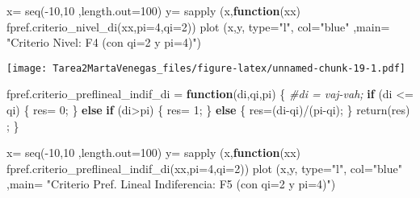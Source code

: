 \documentclass[
]{article}
\newenvironment{Shaded}{\begin{snugshade}}{\end{snugshade}}
\newcommand{\AttributeTok}[1]{\textcolor[rgb]{0.77,0.63,0.00}{#1}}
\newcommand{\CommentTok}[1]{\textcolor[rgb]{0.56,0.35,0.01}{\textit{#1}}}
\newcommand{\ControlFlowTok}[1]{\textcolor[rgb]{0.13,0.29,0.53}{\textbf{#1}}}
\newcommand{\DecValTok}[1]{\textcolor[rgb]{0.00,0.00,0.81}{#1}}
\newcommand{\FunctionTok}[1]{\textcolor[rgb]{0.00,0.00,0.00}{#1}}
\newcommand{\NormalTok}[1]{#1}
\newcommand{\OtherTok}[1]{\textcolor[rgb]{0.56,0.35,0.01}{#1}}
\newcommand{\SpecialCharTok}[1]{\textcolor[rgb]{0.00,0.00,0.00}{#1}}
\newcommand{\StringTok}[1]{\textcolor[rgb]{0.31,0.60,0.02}{#1}}
\begin{document}
\begin{Shaded}
\begin{Highlighting}[]
\NormalTok{x}\OtherTok{=} \FunctionTok{seq}\NormalTok{(}\SpecialCharTok{{-}}\DecValTok{10}\NormalTok{,}\DecValTok{10}\NormalTok{ ,}\AttributeTok{length.out=}\DecValTok{100}\NormalTok{)}
\NormalTok{y}\OtherTok{=} \FunctionTok{sapply}\NormalTok{ (x,}\ControlFlowTok{function}\NormalTok{(xx) }\FunctionTok{fpref.criterio\_nivel\_di}\NormalTok{(xx,}\AttributeTok{pi=}\DecValTok{4}\NormalTok{,}\AttributeTok{qi=}\DecValTok{2}\NormalTok{))}
\FunctionTok{plot}\NormalTok{ (x,y, }\AttributeTok{type=}\StringTok{"l"}\NormalTok{, }\AttributeTok{col=}\StringTok{"blue"}\NormalTok{ ,}\AttributeTok{main=} \StringTok{"Criterio}
\StringTok{      Nivel: F4 (con qi=2 y pi=4)"}\NormalTok{)}
\end{Highlighting}
\end{Shaded}

\texttt{[image: Tarea2MartaVenegas\_files/figure-latex/unnamed-chunk-19-1.pdf]}

\begin{Shaded}
\begin{Highlighting}[]
\NormalTok{fpref.criterio\_preflineal\_indif\_di }\OtherTok{=} \ControlFlowTok{function}\NormalTok{(di,qi,pi) \{}
              \CommentTok{\#di = vaj{-}vah;}
    \ControlFlowTok{if}\NormalTok{ (di }\SpecialCharTok{\textless{}=}\NormalTok{ qi) \{}
\NormalTok{      res}\OtherTok{=} \DecValTok{0}\NormalTok{;}
\NormalTok{      \} }\ControlFlowTok{else} \ControlFlowTok{if}\NormalTok{ (di}\SpecialCharTok{\textgreater{}}\NormalTok{pi) \{}
\NormalTok{        res}\OtherTok{=} \DecValTok{1}\NormalTok{;}
\NormalTok{      \} }\ControlFlowTok{else}\NormalTok{ \{}
\NormalTok{        res}\OtherTok{=}\NormalTok{(di}\SpecialCharTok{{-}}\NormalTok{qi)}\SpecialCharTok{/}\NormalTok{(pi}\SpecialCharTok{{-}}\NormalTok{qi);}
\NormalTok{      \}}
       \FunctionTok{return}\NormalTok{(res) ;}
\NormalTok{  \}}
\end{Highlighting}
\end{Shaded}

\begin{Shaded}
\begin{Highlighting}[]
\NormalTok{x}\OtherTok{=} \FunctionTok{seq}\NormalTok{(}\SpecialCharTok{{-}}\DecValTok{10}\NormalTok{,}\DecValTok{10}\NormalTok{ ,}\AttributeTok{length.out=}\DecValTok{100}\NormalTok{)}
\NormalTok{y}\OtherTok{=} \FunctionTok{sapply}\NormalTok{ (x,}\ControlFlowTok{function}\NormalTok{(xx) }\FunctionTok{fpref.criterio\_preflineal\_indif\_di}\NormalTok{(xx,}\AttributeTok{pi=}\DecValTok{4}\NormalTok{,}\AttributeTok{qi=}\DecValTok{2}\NormalTok{))}
\FunctionTok{plot}\NormalTok{ (x,y, }\AttributeTok{type=}\StringTok{"l"}\NormalTok{, }\AttributeTok{col=}\StringTok{"blue"}\NormalTok{ ,}\AttributeTok{main=} \StringTok{"Criterio Pref. Lineal Indiferencia: F5 (con qi=2 y pi=4)"}\NormalTok{)}
\end{Highlighting}
\end{Shaded}
\end{document}

